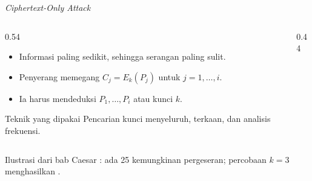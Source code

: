\documentclass[aspectratio=169,11pt]{beamer}
\begin{document}
\begin{frame}{\textit{Ciphertext-Only Attack}}
    \begin{columns}[T,onlytextwidth]
        \begin{column}{0.54\textwidth}
            \begin{itemize}
                \item Informasi paling sedikit, sehingga serangan paling sulit.
                \item Penyerang memegang $C_j=E_k(P_j)$ untuk $j=1,\dots,i$.
                \item Ia harus mendeduksi $P_1,\dots,P_i$ atau kunci $k$.
            \end{itemize}
            \begin{exampleblock}{Teknik yang dipakai}
                \footnotesize
                Pencarian kunci menyeluruh, terkaan, dan analisis frekuensi.
            \end{exampleblock}
        \end{column}
        \begin{column}{0.44\textwidth}
            \centering
        \end{column}
    \end{columns}
    \vspace{0.05cm}
    \begin{block}{Ilustrasi dari bab}
        \footnotesize
        Caesar : ada 25 kemungkinan pergeseran; percobaan
        $k=3$ menghasilkan .
    \end{block}
\end{frame}
\end{document}
